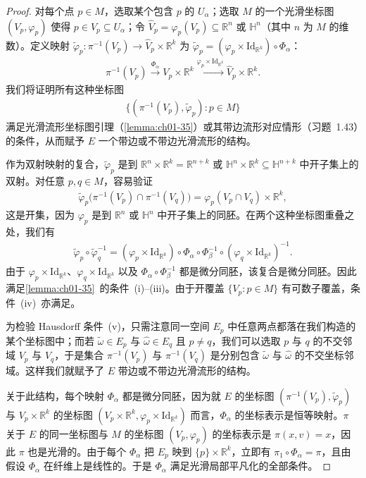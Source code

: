 \documentclass[../../main.tex]{subfiles}
\begin{document}
\begin{proof}
对每个点 $p\in M$，选取某个包含 $p$ 的 $U_\alpha$；选取 $M$ 的一个光滑坐标图 $(V_p,\varphi_p)$ 使得 $p\in V_p\subseteq U_\alpha$；令 $\widehat V_p=\varphi_p(V_p)\subseteq\mathbb{R}^n$ 或 $\mathbb{H}^n$（其中 $n$ 为 $M$ 的维数）。定义映射 $\widetilde\varphi_p\colon\pi^{-1}(V_p)\to\widehat V_p\times\mathbb{R}^k$ 为 $\widetilde\varphi_p=(\varphi_p\times\mathrm{Id}_{\mathbb{R}^k})\circ\Phi_\alpha$：
\begin{align*}
\pi^{-1}(V_p)\xrightarrow{\Phi_\alpha}V_p\times\mathbb{R}^k\xrightarrow{\varphi_p\times\mathrm{Id}_{\mathbb{R}^k}}\widehat V_p\times\mathbb{R}^k.
\end{align*}
我们将证明所有这种坐标图
\begin{align*}
\{(\pi^{-1}(V_p),\widetilde\varphi_p):p\in M\}
\end{align*}
满足光滑流形坐标图引理（\cref{lemma:ch01-35}）或其带边流形对应情形（习题~1.43）的条件，从而赋予 $E$ 一个带边或不带边光滑流形的结构。

作为双射映射的复合，$\widetilde\varphi_p$ 是到 $\mathbb{R}^n\times\mathbb{R}^k=\mathbb{R}^{n+k}$ 或 $\mathbb{H}^n\times\mathbb{R}^k\subseteq\mathbb{H}^{n+k}$ 中开子集上的双射。对任意 $p,q\in M$，容易验证
\begin{align*}
\widetilde\varphi_p\big(\pi^{-1}(V_p)\cap\pi^{-1}(V_q)\big)=\varphi_p(V_p\cap V_q)\times\mathbb{R}^k,
\end{align*}
这是开集，因为 $\varphi_p$ 是到 $\mathbb{R}^n$ 或 $\mathbb{H}^n$ 中开子集上的同胚。在两个这种坐标图重叠之处，我们有
\begin{align*}
\widetilde\varphi_p\circ\widetilde\varphi_q^{-1}=(\varphi_p\times\mathrm{Id}_{\mathbb{R}^k})\circ\Phi_\alpha\circ\Phi_\beta^{-1}\circ(\varphi_q\times\mathrm{Id}_{\mathbb{R}^k})^{-1}.
\end{align*}
由于 $\varphi_p\times\mathrm{Id}_{\mathbb{R}^k}$、$\varphi_q\times\mathrm{Id}_{\mathbb{R}^k}$ 以及 $\Phi_\alpha\circ\Phi_\beta^{-1}$ 都是微分同胚，该复合是微分同胚。因此满足\cref{lemma:ch01-35}~的条件~(i)--(iii)。由于开覆盖 $\{V_p:p\in M\}$ 有可数子覆盖，条件~(iv)~亦满足。

为检验 Hausdorff 条件~(v)，只需注意同一空间 $E_p$ 中任意两点都落在我们构造的某个坐标图中；而若 $\tilde\omega\in E_p$ 与 $\hat\omega\in E_q$ 且 $p\neq q$，我们可以选取 $p$ 与 $q$ 的不交邻域 $V_p$ 与 $V_q$，于是集合 $\pi^{-1}(V_p)$ 与 $\pi^{-1}(V_q)$ 是分别包含 $\tilde\omega$ 与 $\hat\omega$ 的不交坐标邻域。这样我们就赋予了 $E$ 带边或不带边光滑流形的结构。

关于此结构，每个映射 $\Phi_\alpha$ 都是微分同胚，因为就 $E$ 的坐标图 $(\pi^{-1}(V_p),\widetilde\varphi_p)$ 与 $V_p\times\mathbb{R}^k$ 的坐标图 $(V_p\times\mathbb{R}^k,\varphi_p\times\mathrm{Id}_{\mathbb{R}^k})$ 而言，$\Phi_\alpha$ 的坐标表示是恒等映射。$\pi$ 关于 $E$ 的同一坐标图与 $M$ 的坐标图 $(V_p,\varphi_p)$ 的坐标表示是 $\pi(x,v)=x$，因此 $\pi$ 也是光滑的。由于每个 $\Phi_\alpha$ 把 $E_p$ 映到 $\{p\}\times\mathbb{R}^k$，立即有 $\pi_1\circ\Phi_\alpha=\pi$，且由假设 $\Phi_\alpha$ 在纤维上是线性的。于是 $\Phi_\alpha$ 满足光滑局部平凡化的全部条件。


\end{proof}
\end{document}
